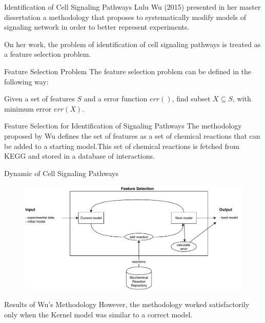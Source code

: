 \documentclass{beamer}
\begin{document}
\begin{frame}{Identification of Cell Signaling Pathways}
Lulu Wu (2015) presented in her master dissertation a methodology that 
proposes to systematically modify models of signaling network in order
to better represent experiments.
\pause

On her work, the problem of identification of cell signaling pathways is
treated as a feature selection problem.
\end{frame}


\begin{frame}{Feature Selection Problem}
The feature selection problem can be defined in the following way:
\begin{center}
Given a set of features $S$ and a error function $err()$, find subset 
        $X \subseteq S$, with minimum error $err(X)$.
\end{center}
\end{frame}


\begin{frame}{Feature Selection for Identification of Signaling 
Pathways}
The methodology proposed by Wu defines the set of features as a set of 
chemical reactions that can be added to a starting model.\pause This set 
of chemical reactions is fetched from KEGG and stored in a database of
interactions.
\end{frame}


\begin{frame}{Dynamic of Cell Signaling Pathways}
\begin{flushleft}
\begin{figure}
    \includegraphics[scale=.57]{introduction/Lulu_methodology_diagram.pdf}
\end{figure}
\end{flushleft}
\end{frame}


\begin{frame}{Results of Wu's Methodology}
However, the methodology worked satisfactorily only when the Kernel 
model was similar to a correct model.
\end{frame}
\end{document}
